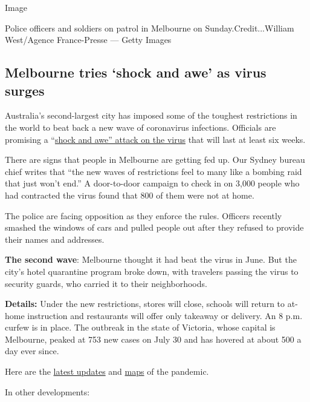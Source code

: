 Image

Police officers and soldiers on patrol in Melbourne on
Sunday.Credit...William West/Agence France-Presse --- Getty Images

\hypertarget{melbourne-tries-shock-and-awe-as-virus-surges}{%
\subsection{Melbourne tries `shock and awe' as virus
surges}\label{melbourne-tries-shock-and-awe-as-virus-surges}}

Australia's second-largest city has imposed some of the toughest
restrictions in the world to beat back a new wave of coronavirus
infections. Officials are promising a
``\href{https://www.nytimes3xbfgragh.onion/2020/08/04/world/australia/coronavirus-melbourne-lockdown.html}{shock
and awe'' attack on the virus} that will last at least six weeks.

There are signs that people in Melbourne are getting fed up. Our Sydney
bureau chief writes that ``the new waves of restrictions feel to many
like a bombing raid that just won't end.'' A door-to-door campaign to
check in on 3,000 people who had contracted the virus found that 800 of
them were not at home.

The police are facing opposition as they enforce the rules. Officers
recently smashed the windows of cars and pulled people out after they
refused to provide their names and addresses.

\textbf{The second wave}: Melbourne thought it had beat the virus in
June. But the city's hotel quarantine program broke down, with travelers
passing the virus to security guards, who carried it to their
neighborhoods.

\textbf{Details:} Under the new restrictions, stores will close, schools
will return to at-home instruction and restaurants will offer only
takeaway or delivery. An 8 p.m. curfew is in place. The outbreak in the
state of Victoria, whose capital is Melbourne, peaked at 753 new cases
on July 30 and has hovered at about 500 a day ever since.

Here are the
\href{https://www.nytimes3xbfgragh.onion/2020/08/04/world/coronavirus-covid-19.html?action=click\&module=Top\%20Stories\&pgtype=Homepage}{latest
updates} and
\href{https://www.nytimes3xbfgragh.onion/interactive/2020/world/coronavirus-maps.html}{maps}
of the pandemic.

In other developments:

